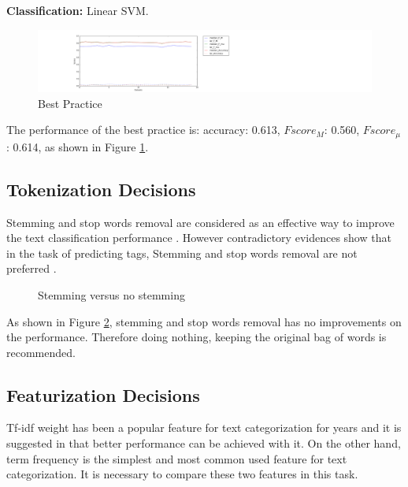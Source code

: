 \documentclass{sig-alternate-05-2015}
\begin{document}
\textbf{Classification:} Linear SVM.

\begin{figure}[ht]
  \includegraphics[width=\linewidth]{./fig/best.png}
  \caption{Best Practice}
  \label{fig:best}
\end{figure}

The performance of the best practice is: accuracy: 0.613, $Fscore_{M}$: 0.560, $Fscore_{\mu}$: 0.614, as shown in Figure \ref{fig:best}. 

\subsection{Tokenization Decisions}

Stemming and stop words removal are considered as an effective way to improve the text classification performance \cite{yang1997comparative}. However contradictory evidences show that in the task of predicting tags, Stemming and stop words removal are not preferred \cite{moharanatag,stanley2013predicting}.

\begin{figure}[ht]
    \centering
    \quad
    \quad
    \caption{Stemming versus no stemming}
    \label{fig:stem}
\end{figure}

As shown in Figure \ref{fig:stem}, stemming and stop words removal has no improvements on the performance. Therefore doing nothing, keeping the original bag of words is recommended.

\subsection{Featurization Decisions}

Tf-idf weight has been a popular feature for text categorization for years \cite{caropreso2001learner} and it is suggested in \cite{moharanatag} that better performance can be achieved with it. On the other hand, term frequency is the simplest and most common used feature for text categorization. It is necessary to compare these two features in this task.
\end{document}
